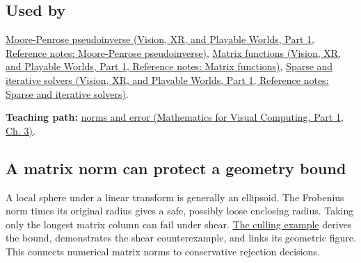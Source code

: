 \subsection{Used by}\label{appendix-f8657bac66e5-used-by}

\hypertarget{appendix-f8657bac66e5-used-by}{}

\href{../07-Vision-XR-and-Playable-Worlds-P01/main.pdf\#appendix-541306fdbc1b}{Moore-Penrose pseudoinverse (Vision, XR, and Playable Worlds, Part 1, Reference notes: Moore-Penrose pseudoinverse)}, \href{../07-Vision-XR-and-Playable-Worlds-P01/main.pdf\#appendix-0f4bc2bf2b1f}{Matrix functions (Vision, XR, and Playable Worlds, Part 1, Reference notes: Matrix functions)}, \href{../07-Vision-XR-and-Playable-Worlds-P01/main.pdf\#appendix-67c87a3d9e94}{Sparse and iterative solvers (Vision, XR, and Playable Worlds, Part 1, Reference notes: Sparse and iterative solvers)}.

\textbf{Teaching path:} \href{../02-Mathematics-for-Visual-Computing-P01/main.pdf\#01-foundations-i-ch019-matrix-norms-give-scale-to-residuals-and-error-claims}{norms and error (Mathematics for Visual Computing, Part 1, Ch. 3)}.

\subsection{A matrix norm can protect a geometry bound}\label{appendix-f8657bac66e5-a-matrix-norm-can-protect-a-geometry-bound}

\hypertarget{appendix-f8657bac66e5-a-matrix-norm-can-protect-a-geometry-bound}{}

A local sphere under a linear transform is generally an ellipsoid. The Frobenius norm times its original radius gives a safe, possibly loose enclosing radius. Taking only the longest matrix column can fail under shear. \hyperref[04-visual-computing-ii-ch028-a-line-corridor-can-be-a-cheap-prefilter-for-shadow-caster-work]{The culling example} derives the bound, demonstrates the shear counterexample, and links its geometric figure. This connects numerical matrix norms to conservative rejection decisions.
